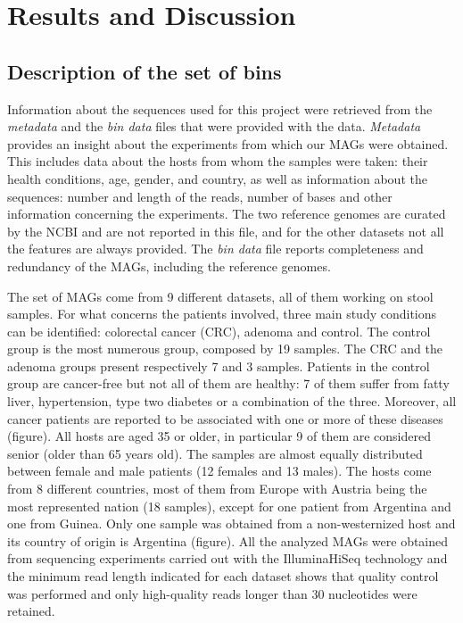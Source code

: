 \section*{Results and Discussion}

\subsection*{Description of the set of bins}

Information about the sequences used for this project were retrieved from the \textit{metadata} and the \textit{bin data} files that were provided with the data. \textit{Metadata} provides an insight about the experiments from which our MAGs were obtained. This includes data about the hosts from whom the samples were taken: their health conditions, age, gender, and country, as well as information about the sequences: number and length of the reads, number of bases and other information concerning the experiments. The two reference genomes are curated by the NCBI and are not reported in this file, and for the other datasets not all the features are always provided. The \textit{bin data} file reports completeness and redundancy of the MAGs, including the reference genomes.

The set of MAGs come from 9 different datasets, all of them working on stool samples. For what concerns the patients involved, three main study conditions can be identified: colorectal cancer (CRC), adenoma and control. The control group is the most numerous group, composed by 19 samples. The CRC and the adenoma groups present respectively 7 and 3 samples. Patients in the control group are cancer-free but not all of them are healthy: 7 of them suffer from fatty liver, hypertension, type two diabetes or a combination of the three. Moreover, all cancer patients are reported to be associated with one or more of these diseases (figure). All hosts are aged 35 or older, in particular 9 of them are considered senior (older than 65 years old). The samples are almost equally distributed between female and male patients (12 females and 13 males). The hosts come from 8 different countries, most of them from Europe with Austria being the most represented nation (18 samples), except for one patient from Argentina and one from Guinea. Only one sample was obtained from a non-westernized host and its country of origin is Argentina (figure). All the analyzed MAGs were obtained from sequencing experiments carried out with the IlluminaHiSeq technology and the minimum read length indicated for each dataset shows that quality control was performed and only high-quality reads longer than 30 nucleotides were retained.

